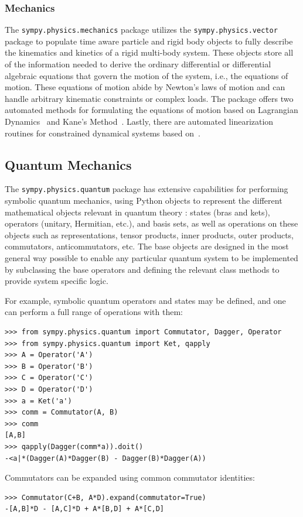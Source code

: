 \subsubsection{Mechanics}

The \verb|sympy.physics.mechanics| package utilizes the \texttt{sympy.\allowbreak{}physics.\allowbreak{}vector} package
to populate time aware particle and rigid body objects to fully describe the
kinematics and kinetics of a rigid multi-body system. These objects store all
of the information needed to derive the ordinary differential or differential
algebraic equations that govern the motion of the system, i.e., the equations
of motion. These equations of motion abide by Newton's laws of motion and can
handle arbitrary kinematic constraints or complex loads. The package
offers two automated methods for formulating the equations of motion based on
Lagrangian Dynamics~\cite{Lagrange1811} and Kane's Method~\cite{Kane1985}. Lastly, there
are automated linearization routines for constrained dynamical
systems based on~\cite{Peterson2014}.

\subsection{Quantum Mechanics}

The \verb|sympy.physics.quantum| package has extensive capabilities for
performing symbolic quantum mechanics, using Python objects to represent the
different mathematical objects relevant in quantum theory \cite{Sakurai2010}:
states (bras and kets), operators (unitary, Hermitian, etc.), and basis sets, as
well as operations on these objects such as representations, tensor products,
inner products, outer products, commutators, anticommutators, etc. The base
objects are designed in the most general way possible to enable any particular
quantum system to be implemented by subclassing the base operators and defining
the relevant class methods to provide system specific logic.

For example, symbolic quantum operators and states may be defined, and one can perform
a full range of operations with them:
\begin{verbatim}
>>> from sympy.physics.quantum import Commutator, Dagger, Operator
>>> from sympy.physics.quantum import Ket, qapply
>>> A = Operator('A')
>>> B = Operator('B')
>>> C = Operator('C')
>>> D = Operator('D')
>>> a = Ket('a')
>>> comm = Commutator(A, B)
>>> comm
[A,B]
>>> qapply(Dagger(comm*a)).doit()
-<a|*(Dagger(A)*Dagger(B) - Dagger(B)*Dagger(A))
\end{verbatim}
Commutators can be expanded using common commutator identities:
\begin{verbatim}
>>> Commutator(C+B, A*D).expand(commutator=True)
-[A,B]*D - [A,C]*D + A*[B,D] + A*[C,D]
\end{verbatim}

